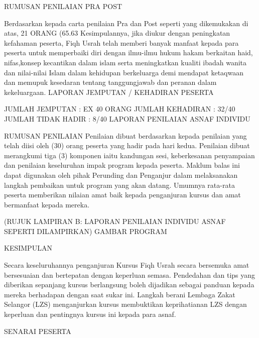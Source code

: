 RUMUSAN PENILAIAN PRA POST



Berdasarkan kepada carta penilaian Pra dan Post seperti yang dikemukakan di atas, 21 ORANG (65.63%
Kesimpulannya, jika diukur dengan peningkatan kefahaman peserta, Fiqh Usrah telah memberi banyak manfaat kepada para peserta untuk memperbaiki diri dengan ilmu-ilmu hukum hakam berkaitan haid, nifas,konsep kecantikan dalam islam serta meningkatkan kualiti ibadah wanita dan nilai-nilai Islam dalam kehidupan berkeluarga demi mendapat ketaqwaan dan memupuk kesedaran tentang tanggungjawab dan peranan dalam kekeluargaan.
LAPORAN JEMPUTAN / KEHADIRAN PESERTA


JUMLAH JEMPUTAN	: EX 40 ORANG JUMLAH KEHADIRAN	: 32/40 JUMLAH TIDAK HADIR	: 8/40
LAPORAN PENILAIAN ASNAF INDIVIDU

RUMUSAN PENILAIAN
Penilaian dibuat berdasarkan kepada penilaian yang telah diisi oleh (30) orang peserta yang hadir pada hari kedua. Penilaian dibuat merangkumi tiga (3) komponen iaitu kandungan sesi, keberkesanan penyampaian dan penilaian keseluruhan impak program kepada peserta. Maklum balas ini dapat digunakan oleh pihak Perunding dan Penganjur dalam melaksanakan langkah pembaikan untuk program yang akan datang. Umumnya rata-rata peserta memberikan nilaian amat baik kepada penganjuran kursus dan amat bermanfaat kepada mereka.

(RUJUK LAMPIRAN B: LAPORAN PENILAIAN INDIVIDU ASNAF SEPERTI DILAMPIRKAN)
GAMBAR PROGRAM







KESIMPULAN

Secara keseluruhannya penganjuran Kursus Fiqh Usrah secara bersemuka amat bersesuaian dan bertepatan dengan keperluan semasa. Pendedahan dan tips yang diberikan sepanjang kursus berlangsung boleh dijadikan sebagai panduan kepada mereka berhadapan dengan saat sukar ini. Langkah berani Lembaga Zakat Selangor (LZS) menganjurkan kursus membuktikan keprihatianan LZS dengan keperluan dan pentingnya kursus ini kepada para asnaf.






SENARAI PESERTA
